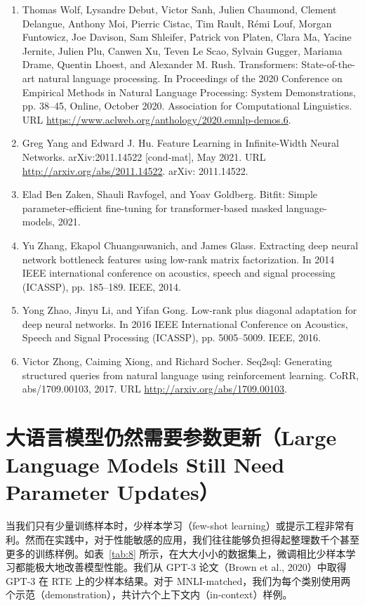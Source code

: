 \documentclass[11pt,UTF8,fontset=fandol]{ctexart}
\begin{document}
\begin{enumerate}[leftmargin=2em,itemsep=2pt]
\item Thomas Wolf, Lysandre Debut, Victor Sanh, Julien Chaumond, Clement Delangue, Anthony Moi, Pierric Cistac, Tim Rault, R\'emi Louf, Morgan Funtowicz, Joe Davison, Sam Shleifer, Patrick von Platen, Clara Ma, Yacine Jernite, Julien Plu, Canwen Xu, Teven Le Scao, Sylvain Gugger, Mariama Drame, Quentin Lhoest, and Alexander M. Rush. Transformers: State-of-the-art natural language processing. In Proceedings of the 2020 Conference on Empirical Methods in Natural Language Processing: System Demonstrations, pp. 38--45, Online, October 2020. Association for Computational Linguistics. URL \url{https://www.aclweb.org/anthology/2020.emnlp-demos.6}.
\item Greg Yang and Edward J. Hu. Feature Learning in Infinite-Width Neural Networks. arXiv:2011.14522 [cond-mat], May 2021. URL \url{http://arxiv.org/abs/2011.14522}. arXiv: 2011.14522.
\item Elad Ben Zaken, Shauli Ravfogel, and Yoav Goldberg. Bitfit: Simple parameter-efficient fine-tuning for transformer-based masked language-models, 2021.
\item Yu Zhang, Ekapol Chuangsuwanich, and James Glass. Extracting deep neural network bottleneck features using low-rank matrix factorization. In 2014 IEEE international conference on acoustics, speech and signal processing (ICASSP), pp. 185--189. IEEE, 2014.
\item Yong Zhao, Jinyu Li, and Yifan Gong. Low-rank plus diagonal adaptation for deep neural networks. In 2016 IEEE International Conference on Acoustics, Speech and Signal Processing (ICASSP), pp. 5005--5009. IEEE, 2016.
\item Victor Zhong, Caiming Xiong, and Richard Socher. Seq2sql: Generating structured queries from natural language using reinforcement learning. CoRR, abs/1709.00103, 2017. URL \url{http://arxiv.org/abs/1709.00103}.
\end{enumerate}

\appendix
\section{大语言模型仍然需要参数更新（Large Language Models Still Need Parameter Updates）}

当我们只有少量训练样本时，少样本学习（few-shot learning）或提示工程非常有利。然而在实践中，对于性能敏感的应用，我们往往能够负担得起整理数千个甚至更多的训练样例。如表~\ref{tab:8} 所示，在大大小小的数据集上，微调相比少样本学习都能极大地改善模型性能。我们从 GPT-3 论文（Brown et al., 2020）中取得 GPT-3 在 RTE 上的少样本结果。对于 MNLI-matched，我们为每个类别使用两个示范（demonstration），共计六个上下文内（in-context）样例。
\end{document}
